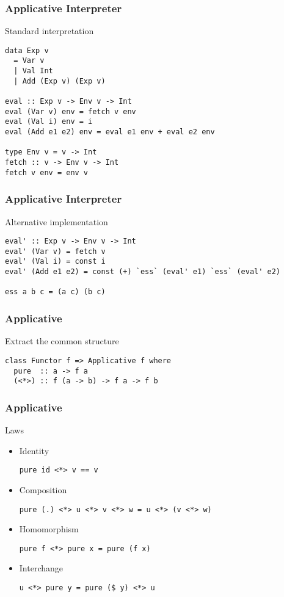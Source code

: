 \documentclass{beamer}
\begin{document}
\begin{frame}[fragile]
  \frametitle{Applicative Interpreter}
  \begin{block}{Standard interpretation}
\begin{verbatim}
data Exp v
  = Var v
  | Val Int
  | Add (Exp v) (Exp v)

eval :: Exp v -> Env v -> Int
eval (Var v) env = fetch v env
eval (Val i) env = i
eval (Add e1 e2) env = eval e1 env + eval e2 env

type Env v = v -> Int
fetch :: v -> Env v -> Int
fetch v env = env v
\end{verbatim} 
\end{block}
\end{frame}            


\begin{frame}[fragile]
  \frametitle{Applicative Interpreter}
  \begin{alertblock}{Alternative implementation}
\begin{verbatim}
eval' :: Exp v -> Env v -> Int
eval' (Var v) = fetch v
eval' (Val i) = const i
eval' (Add e1 e2) = const (+) `ess` (eval' e1) `ess` (eval' e2)

ess a b c = (a c) (b c)
\end{verbatim} 
\end{alertblock}
\end{frame}

\begin{frame}[fragile]
  \frametitle{Applicative}
\begin{exampleblock}{Extract the common structure}
\begin{verbatim}
class Functor f => Applicative f where
  pure  :: a -> f a
  (<*>) :: f (a -> b) -> f a -> f b
\end{verbatim} 
\end{exampleblock}
\end{frame}            

\begin{frame}[fragile]
  \frametitle{Applicative}
  \begin{block}{Laws}
  \begin{itemize}       
  \item Identity
\begin{verbatim}
pure id <*> v == v
\end{verbatim}
  \item Composition
\begin{verbatim}
pure (.) <*> u <*> v <*> w = u <*> (v <*> w)
\end{verbatim}
  \item Homomorphism
\begin{verbatim}
pure f <*> pure x = pure (f x)
\end{verbatim}
  \item Interchange
\begin{verbatim}
u <*> pure y = pure ($ y) <*> u
\end{verbatim}
  \end{itemize} 
  \end{block}   
\end{frame}
\end{document}
